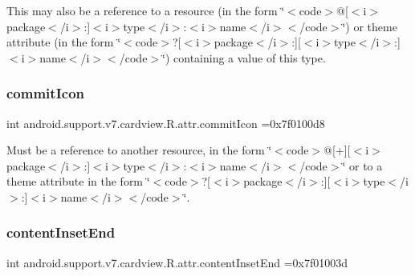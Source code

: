 This may also be a reference to a resource (in the form \char`\"{}$<$code$>$@\mbox{[}$<$i$>$package$<$/i$>$\+:\mbox{]}$<$i$>$type$<$/i$>$\+:$<$i$>$name$<$/i$>$$<$/code$>$\char`\"{}) or theme attribute (in the form \char`\"{}$<$code$>$?\mbox{[}$<$i$>$package$<$/i$>$\+:\mbox{]}\mbox{[}$<$i$>$type$<$/i$>$\+:\mbox{]}$<$i$>$name$<$/i$>$$<$/code$>$\char`\"{}) containing a value of this type. \mbox{\label{classandroid_1_1support_1_1v7_1_1cardview_1_1R_1_1attr_a279c2fff10e4895b410724ac6530869c}} 
\subsubsection{\texorpdfstring{commit\+Icon}{commitIcon}}
{\footnotesize\ttfamily int android.\+support.\+v7.\+cardview.\+R.\+attr.\+commit\+Icon =0x7f0100d8\hspace{0.3cm}{\ttfamily [static]}}

Must be a reference to another resource, in the form \char`\"{}$<$code$>$@\mbox{[}+\mbox{]}\mbox{[}$<$i$>$package$<$/i$>$\+:\mbox{]}$<$i$>$type$<$/i$>$\+:$<$i$>$name$<$/i$>$$<$/code$>$\char`\"{} or to a theme attribute in the form \char`\"{}$<$code$>$?\mbox{[}$<$i$>$package$<$/i$>$\+:\mbox{]}\mbox{[}$<$i$>$type$<$/i$>$\+:\mbox{]}$<$i$>$name$<$/i$>$$<$/code$>$\char`\"{}. \mbox{\label{classandroid_1_1support_1_1v7_1_1cardview_1_1R_1_1attr_a8d34f6f6765a63fc1536f666306ebf8f}} 
\subsubsection{\texorpdfstring{content\+Inset\+End}{contentInsetEnd}}
{\footnotesize\ttfamily int android.\+support.\+v7.\+cardview.\+R.\+attr.\+content\+Inset\+End =0x7f01003d\hspace{0.3cm}{\ttfamily [static]}}

